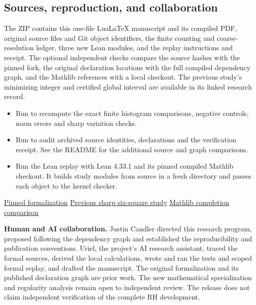\documentclass[12pt,letterpaper]{article}
\newcommand{\code}[1]{\texttt{\detokenize{#1}}}
\begin{document}
\clearpage\subsection*{Sources, reproduction, and collaboration}\label{collab}
The ZIP contains this one-file LuaLaTeX manuscript and its compiled PDF, original source files and Git object identifiers, the finite counting and coarse-resolution ledger, three new Lean modules, and the replay instructions and receipt. The optional independent checks compare the source hashes with the pinned fork, the original declaration locations with the full compiled dependency graph, and the Mathlib references with a local checkout. The previous study's minimizing integer and certified global interval are available in its linked research record.

\begin{itemize}
\item Run \code{python3 -B experiment.py} to recompute the exact finite histogram comparisons, negative controls, norm errors and sharp variation checks.
\item Run \code{python3 -B verify.py} to audit archived source identities, declarations and the verification receipt. See the README for the additional source and graph comparisons.
\item Run the Lean replay with Lean 4.33.1 and its pinned compiled Mathlib checkout. It builds study modules from source in a fresh directory and passes each object to the kernel checker.
\end{itemize}
\href{https://github.com/nousentllc/riemann-hypothesis/tree/40e56bab026552e089d7afcfeff08d2defb9c005/src}{Pinned formalization}
\quad\href{https://github.com/nousentllc/riemann-hypothesis/tree/609877747df336e925a39085acf02c8f994f66a3/research/uriel/experiments/rank-one-growth}{Previous sharp six-square study}
\quad\href{https://github.com/leanprover-community/mathlib4/blob/0df444a360eaa60ab8c11dca51a86af692955474/Mathlib/NumberTheory/Padics/HeightOneSpectrum.lean}{Mathlib completion comparison}

\textbf{Human and AI collaboration.} Justin Candler directed this research program, proposed following the dependency graph and established the reproducibility and publication conventions. Uriel, the project's AI research assistant, traced the formal sources, derived the local calculations, wrote and ran the tests and scoped formal replay, and drafted the manuscript. The original formalization and its published declaration graph are prior work. The new mathematical specialization and regularity analysis remain open to independent review. The release does not claim independent verification of the complete RH development.
\end{document}
